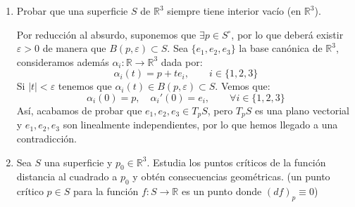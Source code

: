 \begin{ejercicio}
\begin{enumerate}
\begin{enumerate}[label=\alph*)]
                    Elegimos ahora un vector $p_0$ unitario y ortogonal a ambos (tenemos solo dos posibles vectores de este estilo, elegimos una). Veamos que $p_0$ es un vector propio, pues:
                    \begin{align*}
                        \langle Ap_0,p_M \rangle = \langle p_0,Ap_M \rangle = f(p_M) \langle p_0,p_M \rangle  = 0
                    \end{align*}
                    La cuenta análoga para $p_m$ saldrá igual, por lo que $Ap_0$ no tiene componente ni en $p_M$ ni en $p_m$. Como $\{p_M,p_m,p_0\}$ es una base ortonormal de $\mathbb{R}^3$, por un argumento análogo a lo anterior deducimos que:
                    \begin{equation*}
                        Ap_0 = f(p_0)p_0
                    \end{equation*}
                    Por lo que $p_0$ es un vector propio de $A$, con valor propio $f(p_0)$.

                    En definitiva, $\{p_M,p_m,p_0\}$ es una base ortonormal de $\mathbb{R}^3$ formada por vectores propios de $A$, con valores propios $f(p_M),f(p_m),f(p_0)$. Esta base diagonaliza $A$.
            \end{enumerate}
            Acabamos de probar el Teorema de la Geometría de que siempre se puede diagonalizar una matriz simétrica $3\times 3$. Más aún, hemos conseguido dar más información que el Teorema que teníamos anteriormente, pues sabemos cuáles son los valores propios de la matriz, dos son el máximo y el mínimo correspondientes a la forma cuadrática $f$.
        \item Probar que una superficie $S$ de $\mathbb{R}^3$ siempre tiene interior vacío (en $\mathbb{R}^3$).

            Por reducción al absurdo, suponemos que $\exists p\in S^\circ$, por lo que deberá existir $\varepsilon>0$ de manera que $B(p,\varepsilon)\subset S$. Sea $\{e_1,e_2,e_3\}$ la base canónica de $\mathbb{R}^3$, consideramos además $\alpha_i:\mathbb{R}\to\mathbb{R}^3$ dada por:
            \begin{equation*}
                \alpha_i(t) = p+te_i, \qquad i \in \{1,2,3\}
            \end{equation*}
            Si $|t|<\varepsilon$ tenemos que $\alpha_i(t)\in B(p,\varepsilon)\subset S$. Vemos que:
            \begin{equation*}
                \alpha_i(0) = p, \quad \alpha_i'(0) = e_i, \qquad \forall i \in \{1,2,3\}
            \end{equation*}
            Así, acabamos de probar que $e_1,e_2,e_3\in T_pS$, pero $T_pS$ es una plano vectorial y $e_1,e_2,e_3$ son linealmente independientes, por lo que hemos llegado a una contradicción.
        \item Sea $S$ una superficie y $p_0\in \mathbb{R}^3$. Estudia los puntos críticos de la función distancia al cuadrado a $p_0$ y obtén consecuencias geométricas. (un punto crítico $p\in S$ para la función $f:S\to\mathbb{R}$ es un punto donde $(d f)_p\equiv 0$)


\end{enumerate}
\end{ejercicio}
